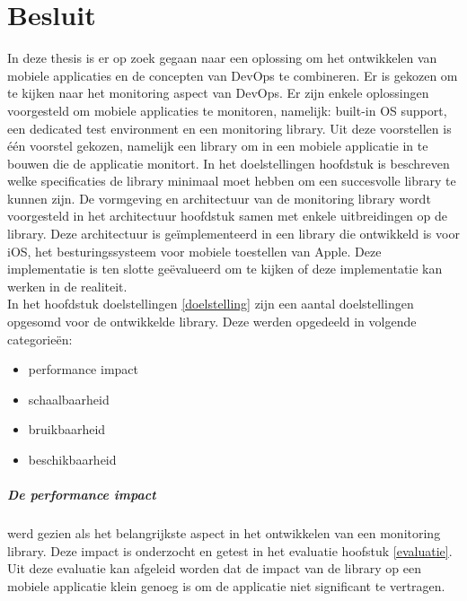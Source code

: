 \chapter{Besluit}
\label{besluit}


In deze thesis is er op zoek gegaan naar een oplossing om het ontwikkelen van mobiele applicaties en de concepten van DevOps te combineren. Er is gekozen om te kijken naar het monitoring aspect van DevOps. Er zijn enkele oplossingen voorgesteld om mobiele applicaties te monitoren, namelijk: built-in OS support, een dedicated test environment en een monitoring library. Uit deze voorstellen is \'e\'en voorstel gekozen, namelijk een library om in een mobiele applicatie in te bouwen die de applicatie monitort. In het doelstellingen hoofdstuk is beschreven welke specificaties de library minimaal moet hebben om een succesvolle library te kunnen zijn. De vormgeving en architectuur van de monitoring library wordt voorgesteld in het architectuur hoofdstuk samen met enkele uitbreidingen op de library. Deze architectuur is ge\"implementeerd in een library die ontwikkeld is voor iOS, het besturingssysteem voor mobiele toestellen van Apple. Deze implementatie is ten slotte ge\"evalueerd om te kijken of deze implementatie kan werken in de realiteit. \\


In het hoofdstuk doelstellingen \ref{doelstelling} zijn een aantal doelstellingen opgesomd voor de ontwikkelde library. Deze werden opgedeeld in volgende categorie\"en: 
\begin{itemize}
\item performance impact
\item schaalbaarheid
\item bruikbaarheid
\item beschikbaarheid
\end{itemize}

\paragraph{De performance impact} werd gezien als het belangrijkste aspect in het ontwikkelen van een monitoring library. Deze impact is onderzocht en getest in het evaluatie hoofstuk \ref{evaluatie}. Uit deze evaluatie kan afgeleid worden dat de impact van de library op een mobiele applicatie klein genoeg is om de applicatie niet significant te vertragen. \\


